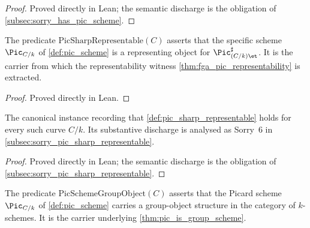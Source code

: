 \begin{proof}

\leanok
  Proved directly in Lean; the semantic discharge is the obligation of
  \cref{subsec:sorry_has_pic_scheme}.
\end{proof}

\begin{definition}
  \label{def:pic_sharp_representable}
  The predicate \(\mathrm{PicSharpRepresentable}(C)\) asserts that the specific scheme
  \(\Pic_{C/k}\) of \cref{def:pic_scheme} is a representing object for
  \(\Pic^\sharp_{(C/k)\et}\). It is the carrier from which the representability
  witness \cref{thm:fga_pic_representability} is extracted.
\end{definition}

\begin{proof}
  Proved directly in Lean.
\end{proof}

\begin{definition}
  \label{def:inst_pic_sharp_representable}
  The canonical instance recording that \cref{def:pic_sharp_representable} holds
  for every such curve \(C/k\). Its substantive discharge is analysed as
  Sorry~6 in \cref{subsec:sorry_pic_sharp_representable}.
\end{definition}

\begin{proof}

\leanok
  Proved directly in Lean; the semantic discharge is the obligation of
  \cref{subsec:sorry_pic_sharp_representable}.
\end{proof}

\begin{definition}
  \label{def:pic_scheme_group_object}
  The predicate \(\mathrm{PicSchemeGroupObject}(C)\) asserts that the Picard scheme
  \(\Pic_{C/k}\) of \cref{def:pic_scheme} carries a group-object structure in
  the category of \(k\)-schemes. It is the carrier underlying
  \cref{thm:pic_is_group_scheme}.
\end{definition}

